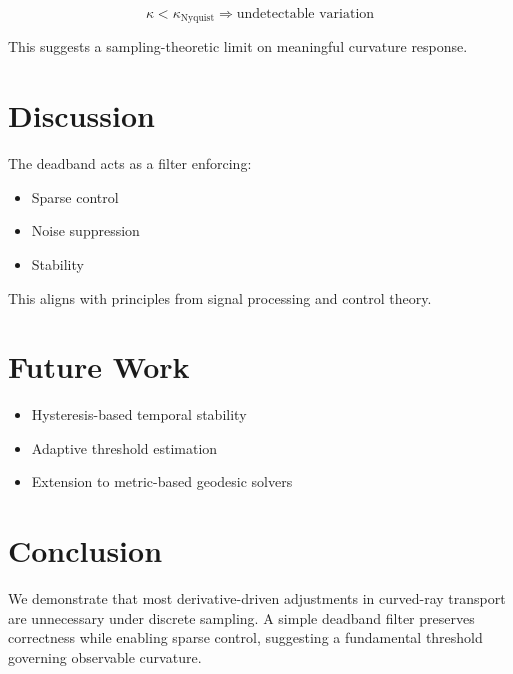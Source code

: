 \documentclass[11pt]{article}
\begin{document}
\begin{equation}
\kappa < \kappa_{\text{Nyquist}} \Rightarrow \text{undetectable variation}
\end{equation}

This suggests a sampling-theoretic limit on meaningful curvature response.

\section{Discussion}

The deadband acts as a filter enforcing:

\begin{itemize}
\item Sparse control
\item Noise suppression
\item Stability
\end{itemize}

This aligns with principles from signal processing and control theory.

\section{Future Work}

\begin{itemize}
\item Hysteresis-based temporal stability
\item Adaptive threshold estimation
\item Extension to metric-based geodesic solvers
\end{itemize}

\section{Conclusion}

We demonstrate that most derivative-driven adjustments in curved-ray transport are unnecessary under discrete sampling. A simple deadband filter preserves correctness while enabling sparse control, suggesting a fundamental threshold governing observable curvature.
\end{document}
